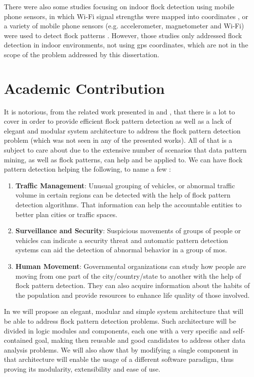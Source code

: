 There were also some studies focusing on indoor flock detection using mobile phone sensors, in which Wi-Fi signal
strengths were mapped into coordinates \cite{mobile1}, or a variety of mobile phone sensors (e.g. accelerometer,
magnetometer and Wi-Fi) were used to detect flock patterns \cite{mobile2}. However, those studies only addressed flock
detection in indoor environments, not using \ac{gps} coordinates, which are not in the scope of the problem addressed by
this dissertation.

\section{Academic Contribution}
It is notorious, from the related work presented in  and , that there is
a lot to cover in order to provide efficient flock pattern detection as well as a lack of elegant and modular system
architecture to address the flock pattern detection problem (which was not seen in any of the presented works). All of
that is a subject to care about due to the extensive number of scenarios that data pattern mining, as well as flock
patterns, can help and be applied to. We can have flock pattern detection helping the following, to name a few
\cite{applications}:

\begin{enumerate}
    \item \textbf{Traffic Management}: Unusual grouping of vehicles, or abnormal traffic volume in certain regions can
        be detected with the help of flock pattern detection algorithms. That information can help the accountable
        entities to better plan cities or traffic spaces.
    \item \textbf{Surveillance and Security}: Suspicious movements of groups of people or vehicles can indicate a
        security threat and automatic pattern detection systems can aid the detection of abnormal behavior in a group of
        \acp{mo}.
    \item \textbf{Human Movement}: Governmental organizations can study how people are moving from one part of the
        city/country/state to another with the help of flock pattern detection. They can also acquire information about
        the habits of the population and provide resources to enhance life quality of those involved.
\end{enumerate}

In  we will propose an elegant, modular and simple system architecture that will be able to
address flock pattern detection problems. Such architecture will be divided in logic modules and components, each one
with a very specific and self-contained goal, making then reusable and good candidates to address other data analysis
problems. We will also show that by modifying a single component in that architecture will enable the usage of a
different software paradigm, thus proving its modularity, extensibility and ease of use.

